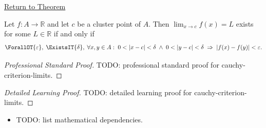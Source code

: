 \newpage
{}
\label{prf:cauchy-criterion-limits}

\begin{remark*}[Return]
\hyperref[prop:cauchy-criterion-limits]{Return to Theorem}
\end{remark*}

\begin{proposition*}
Let $f : A \to \mathbb{R}$ and let $c$ be a cluster point of $A$.
Then $\lim_{x\to c}f(x)=L$ exists for some
$L \in \mathbb{R}$ if and only if
\[
  \ForallOT{\varepsilon},\;
  \ExistsIT{\delta},\;
  \forall x, y \in A :\;
  0<|x-c|<\delta
  \;\wedge\;
  0<|y-c|<\delta
  \;\Rightarrow\;
  |f(x)-f(y)|<\varepsilon.
\]

\smallskip\noindent
\end{proposition*}

\begin{proof}[Professional Standard Proof]
\LRAProofBodyStart
TODO: professional standard proof for cauchy-criterion-limits.
\end{proof}

\begin{proof}[Detailed Learning Proof]
\LRAProofBodyStart
TODO: detailed learning proof for cauchy-criterion-limits.
\end{proof}

\begin{remark*}
\end{remark*}

\begin{dependencies}
\begin{itemize}
  \item TODO: list mathematical dependencies.
\end{itemize}
\end{dependencies}

\clearpage

